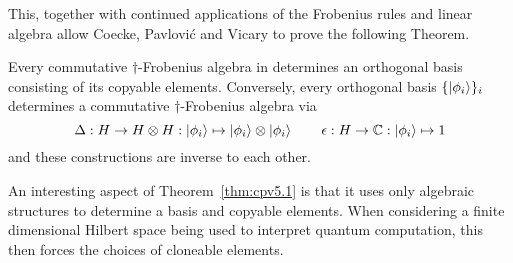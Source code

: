 This, together with continued applications of the Frobenius rules and linear algebra allow Coecke,
Pavlovi\'c and Vicary to prove the following Theorem.
\begin{theorem}\label{thm:cpv5.1}
  Every commutative $\dagger$-Frobenius algebra in \fdh determines an orthogonal basis consisting
  of its copyable elements. Conversely, every orthogonal basis $\{\left\vert{\phi_{i}}\right\rangle\}_{i}$ determines
  a commutative $\dagger$-Frobenius algebra via \[\Delta:H\to H\otimes H: \left\vert{\phi_{i}}\right\rangle\mapsto
  \left\vert{\phi_{i}}\right\rangle \otimes \left\vert{\phi_{i}}\right\rangle\qquad\epsilon : H\to \mathbb{C} : \left\vert{\phi_{i}}\right\rangle \mapsto 1\] and these
  constructions are inverse to each other.
\end{theorem}

An interesting aspect of Theorem~\ref{thm:cpv5.1} is that it uses only algebraic structures to
determine a basis and copyable elements. When considering a finite dimensional Hilbert space being
used to interpret quantum computation, this then forces the choices of cloneable elements.


